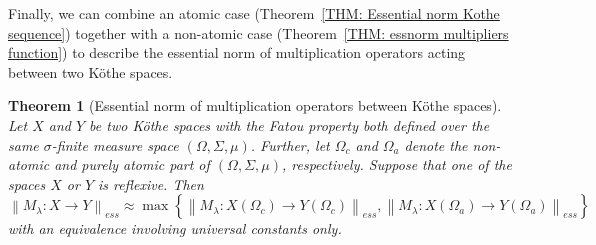 \documentclass[11pt]{amsart}
\theoremstyle{definition}
\newtheorem{theorem}{Theorem}[section]
\theoremstyle{definition}
\theoremstyle{definition}
\theoremstyle{definition}
\theoremstyle{definition}
\theoremstyle{definition}
\theoremstyle{definition}
\theoremstyle{definition}
\numberwithin{equation}{section}
\numberwithin{equation}{section}
\numberwithin{equation}{section}
\theoremstyle{definition}
\theoremstyle{definition}
\theoremstyle{definition}
\theoremstyle{definition}
\theoremstyle{definition}
\theoremstyle{definition}
\newcommand{\norm}[1]{\left\lVert#1\right\rVert}
\begin{document}
Finally, we can combine an atomic case (Theorem~\ref{THM: Essential norm Kothe sequence}) together with a non-atomic case (Theorem~\ref{THM: essnorm multipliers function})
to describe the essential norm of multiplication operators acting between two K{\" o}the spaces.

\begin{theorem}[Essential norm of multiplication operators between K{\" o}the spaces] \label{THM: ess norm func + seq}
	{\it Let $X$ and $Y$ be two K{\" o}the spaces with the Fatou property both defined over the same $\sigma$-finite measure space $(\Omega,\Sigma,\mu)$.
		Further, let $\Omega_c$ and $\Omega_a$ denote the non-atomic and purely atomic part of $(\Omega,\Sigma,\mu)$, respectively.
		Suppose that one of the spaces $X$ or $Y$ is reflexive. Then}
		\begin{equation*}
			\norm{M_{\lambda} \colon X \rightarrow Y}_{ess} \approx
				\max \left\{ \norm{M_{\lambda} \colon X(\Omega_c) \rightarrow Y(\Omega_c)}_{ess}, \norm{M_{\lambda} \colon X(\Omega_a) \rightarrow Y(\Omega_a)}_{ess} \right\}
		\end{equation*}
	{\it with an equivalence involving universal constants only.}
\end{theorem}
\end{document}
